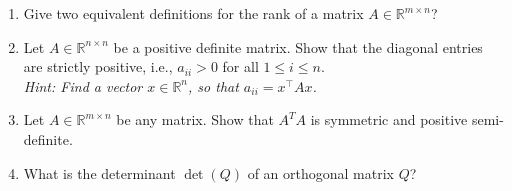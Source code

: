 \begin{enumerate}
	\item Give two equivalent definitions for the rank of a matrix $A \in \mathbb{R}^{m \times n}$?
	\item  Let $A \in \mathbb{R}^{n \times n}$ be a positive definite matrix. Show that the diagonal entries are strictly positive, i.e.,  $a_{ii} > 0$ for all $1\leq i\leq n$.\\
	\textit{Hint: Find a vector $x\in\mathbb{R}^{n}$, so that $a_{ii}=x^\top A x$.}
	\item Let $A \in  \mathbb{R}^{m \times n}$ be any matrix. Show that $A^TA$ is symmetric and positive semi-definite. 
	\item What is the determinant $\det(Q)$ of an orthogonal matrix $Q$?
	
	
\end{enumerate}
 